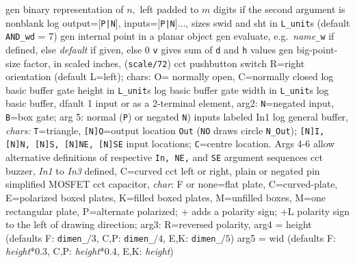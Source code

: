   {gen}
  {binary representation of $n,$ left padded to $m$ digits if the second
   argument is nonblank}
  {log}
  {output=[{\tt P|N}], inputs=[{\tt P|N}]$\ldots$, sizes swid and sht
  in {\tt L\_unit}s (default {\tt AND\_wd} = 7)
    }
  {gen}
  {internal point in a planar object}
  {gen}
  {evaluate, e.g.\ {\sl name}{\tt \_w} if defined, else {\sl default\/}
   if given, else 0 {\tt v} gives sum of {\tt d} and {\tt h} values
     }
  {gen}
  {big-point-size factor, in scaled inches, ({\tt *scale/72})}
  {cct}
  {pushbutton switch R=right orientation (default L=left);
     chars: O= normally open, C=normally closed }
  {log}
  {basic buffer gate height in {\tt L\_unit}s}
  {log}
  {basic buffer gate width in {\tt L\_unit}s}
  {log}
  {basic buffer, dfault 1 input or as a 2-terminal element,
    arg2: {\tt N}=negated input, {\tt B}=box gate; arg 5:
    normal ({\tt P}) or negated {\tt N}) inputs labeled In1 
    }
  {log}
  {general buffer, {\sl chars:} {\tt T}=triangle,
            {\tt [N]O}=output location {\tt Out}
            ({\tt NO} draws circle {\tt N\_Out});
            {\tt [N]I, [N]N, [N]S, [N]NE, [N]SE}
            input locations; {\tt C}=centre location.
            Args 4-6 allow alternative
            definitions of respective {\tt In, NE,}
            and {\tt SE} argument sequences }
  {cct}
  {buzzer, {\sl In1} to {\sl In3} defined, C=curved
   }
  {cct}
  {left or right, plain or negated pin simplified MOSFET}
  {cct}
  {capacitor, {\sl char}: F or none=flat plate, C=curved-plate,
    E=polarized boxed plates,
    K=filled boxed plates,
    M=unfilled boxes,
    M=one rectangular plate,
    P=alternate polarized; + adds a polarity sign;
    +L polarity sign to the left of drawing direction;
    arg3:  R=reversed polarity,
    arg4 = height (defaults F: {\tt dimen\_}$/3$,
      C,P: {\tt dimen\_}$/4$, E,K: {\tt dimen\_}$/5$)
    arg5 = wid (defaults F: {\sl height}*0.3,
      C,P: {\sl height}*0.4, E,K: {\sl height}) }
